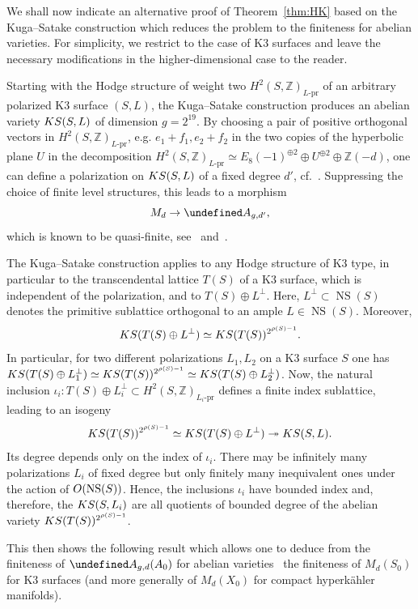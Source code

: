 \documentclass[11pt]{article}
\theoremstyle{definition}
\numberwithin{equation}{section}
\numberwithin{figure}{section}
\numberwithin{table}{section}
\let\cal\undefined
\DeclareMathOperator{\NS}{NS}
\newcommand{\OO}{{\rm O}}
\newcommand{\cal}{\mathcal}
\newcommand{\ka}{{\cal A}}
\newcommand{\ZZ}{\mathbb{Z}}
\renewcommand{\cong}{\simeq}
\begin{document}
\medskip

We shall now indicate an alternative proof of Theorem~\ref{thm:HK} based on the Kuga--Satake construction which reduces the problem to the finiteness for abelian varieties. For simplicity, we restrict to the case of K3 surfaces and leave the necessary modifications in the higher-dimensional case to the reader.

Starting with the Hodge structure of weight two $H^2(S,\ZZ)_{L\text{-pr}}$ of an arbitrary polarized K3 surface $(S,L)$, the Kuga--Satake construction produces an abelian variety ${\rm KS}(S,L)$ of dimension $g=2^{19}$. By choosing a pair of positive orthogonal vectors in $H^2(S,\ZZ)_{L\text{-pr}}$, e.g. $e_1+f_1, e_2+f_2$ in the two copies of the hyperbolic plane $U$ in the decomposition $ H^2(S,\ZZ)_{L\text{-pr}}\cong E_8(-1)^{\oplus 2}\oplus U^{\oplus 2}\oplus\ZZ(-d)$, one can define a polarization on ${\rm KS}(S,L)$ of a fixed degree $d'$, cf.~\cite[Chapter~4]{HuyK3}. Suppressing the choice of finite level structures, this leads to a morphism
\begin{equation}\label{eqn:KS}
M_d\to \ka_{g,d'},
\end{equation}
which is known to be quasi-finite, see~\cite{Andre,Rizov} and~\cite[Proposition~5.10]{Maulik}.

The Kuga--Satake construction applies to any Hodge structure of K3 type, in particular to the transcendental lattice $T(S)$ of a K3 surface, which is independent of the polarization, and to $T(S)\oplus L^\perp$. Here, $L^\perp\subset\NS(S)$ denotes the primitive sublattice
orthogonal to an ample $L\in \NS(S)$. Moreover,
\[
{\rm KS}(T(S)\oplus L^\perp)\cong {\rm KS}(T(S))^{2^{\rho(S)-1}}.
\]
In particular, for two different polarizations $L_1,L_2$ on a K3 surface $S$ one has ${\rm KS}(T(S)\oplus L_1^\perp)\cong {\rm KS}(T(S))^{2^{\rho(S)-1}}\cong{\rm KS}(T(S)\oplus L_2^\perp)$.
Now, the natural inclusion $\iota_i\colon T(S)\oplus L_i^\perp\subset H^2(S,\ZZ)_{L_i\text{-pr}}$ defines a finite index sublattice, leading to an isogeny
\[
{\rm KS}(T(S))^{2^{\rho(S)-1}}\cong{\rm KS}(T(S)\oplus L^\perp)\twoheadrightarrow {\rm KS}(S,L).
\]
Its degree depends only
on the index of $\iota_i$. There may be infinitely many polarizations $L_i$ of fixed degree but only finitely many inequivalent ones under the action of $\OO(\NS(S))$. Hence, the inclusions $\iota_i$ have bounded index and, therefore, the ${\rm KS}(S,L_i)$ are all quotients of bounded degree of the abelian variety ${\rm KS}(T(S))^{2^{\rho(S)-1}}$.

This then shows the following result which allows one to deduce from the finiteness of $\ka_{g,d}(A_0)$ for abelian varieties~\cite{NarNor,Milne} the finiteness of $M_d(S_0)$ for K3 surfaces (and more generally of $M_d(X_0)$ for compact hyperk\"ahler manifolds).
\end{document}
